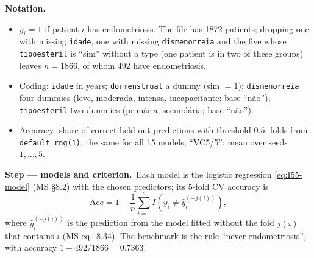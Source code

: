 \documentclass[11pt,a4paper]{article}
\numberwithin{equation}{questao}   %
\newenvironment{notacao}{\par\smallskip\noindent\textbf{Notation.}\begin{itemize}[leftmargin=1.4em,topsep=1pt,itemsep=0pt]\small}{\end{itemize}}
\newcommand{\passo}[2]{\par\smallskip\noindent\textbf{Step --- #1.}~#2}
\begin{document}
\begin{sol}
\begin{notacao}
\item $y_i=1$ if patient $i$ has endometriosis. The file has 1872 patients; dropping one with
  missing \texttt{idade}, one with missing \texttt{dismenorreia} and the five whose \texttt{tipoesteril}
  is ``sim'' without a type (one patient is in two of these groups) leaves $n=1866$, of whom 492 have endometriosis.
\item Coding: \texttt{idade} in years; \texttt{dormenstrual} a dummy (sim $=1$); \texttt{dismenorreia} four
  dummies (leve, moderada, intensa, incapacitante; base ``não''); \texttt{tipoesteril} two dummies
  (primária, secundária; base ``não'').
\item Accuracy: share of correct held-out predictions with threshold $0.5$; folds from
  \texttt{default\_rng(1)}, the same for all 15 models; ``VC5/5'': mean over seeds $1,\dots,5$.
\end{notacao}

\passo{models and criterion}{Each model is the logistic regression \eqref{eq:I55-model} (MS §8.2) with
the chosen predictors; its 5-fold CV accuracy is
\begin{equation}\label{eq:M6-acc}
\mathrm{Acc}=1-\frac1n\sum_{i=1}^nI(y_i\neq\hat y_i^{(-j(i))}),
\end{equation}
where $\hat y_i^{(-j(i))}$ is the prediction from the model fitted without the fold $j(i)$ that contains $i$
(MS eq.~8.34). The benchmark is the rule ``never endometriosis'', with accuracy $1-492/1866=0.7363$.}


\end{sol}
\end{document}
